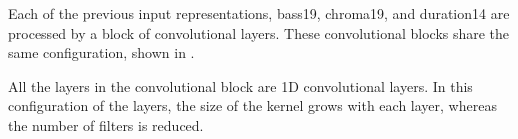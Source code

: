 

Each of the previous input representations, \gls{bass19},
\gls{chroma19}, and \gls{duration14} are processed by a
block of convolutional layers. These convolutional blocks
share the same configuration, shown in
.


All the layers in the convolutional block are 1D
convolutional layers. In this configuration of the layers,
the size of the kernel grows with each layer, whereas the
number of filters is reduced.

